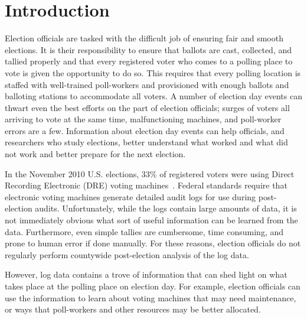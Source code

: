 \documentclass[letterpaper,twocolumn,10pt]{article}
\begin{document}
\section{Introduction}
Election officials are tasked with the difficult job of ensuring fair
  and smooth elections. It is their responsibility to ensure that ballots are
  cast, collected, and tallied properly and that every registered voter who
  comes to a polling place to vote is given the opportunity to do so. This
  requires that every polling location is staffed with well-trained poll-workers
  and provisioned with enough ballots and balloting stations to accommodate all
  voters.  A number of election day events can thwart 
  even the best efforts on the part of election officials; surges of voters all
  arriving to vote at the same time, malfunctioning machines, and poll-worker
  errors are a few. Information about election day events can help officials,
  and researchers who study elections, better understand
  what worked and what did not work and better prepare for the next election.


In the November 2010 U.S. elections, 33\% of registered voters were using Direct
Recording Electronic (DRE) voting machines~\cite{verifiedvoting-votingsystems}.
Federal standards require that electronic voting machines generate detailed
audit logs for use during post-election audits. Unfortunately, while the logs
contain large amounts of data, it is not immediately obvious what sort of useful
information can be learned from the data. Furthermore, even simple
tallies are cumbersome, time consuming, and prone to human error if done
manually. For these reasons, election officials do not regularly perform
countywide post-election analysis of the log data.

However, log data contains a trove of information that can shed light
on what takes place at the polling place on election day. For example,
election officials can use the information to learn about voting machines that
may need maintenance, or ways that poll-workers and other resources may be
better allocated.
\end{document}
